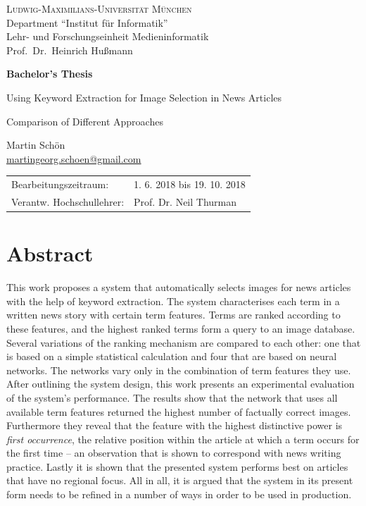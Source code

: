 \documentclass[11pt,a4paper,twoside]{article}
\begin{document}
\pagestyle{empty} %

\begin{center}
\textsc{Ludwig-Maximilians-Universität München}\\
Department ``Institut für Informatik''\\
Lehr- und Forschungseinheit Medieninformatik\\
Prof.\ Dr.\ Heinrich Hußmann

\vspace{5cm}
{\large\textbf{Bachelor's Thesis}}\vspace{.5cm}

{\LARGE Using Keyword Extraction for Image Selection in News Articles}\vspace{.3cm}

{\Large Comparison of Different Approaches}\vspace{1cm}

{\large Martin Schön}\\\href{mailto:martingeorg.schoen@gmail.com}{martingeorg.schoen@gmail.com}

\end{center}
\vfill

\begin{tabular}{ll}
Bearbeitungszeitraum: & 1. 6. 2018 bis 19. 10. 2018\\
Verantw. Hochschullehrer: & Prof. Dr. Neil Thurman
\end{tabular}

\clearpage
{}
\section*{Abstract}

This work proposes a system that automatically selects images for news articles with the help of keyword extraction. The system characterises each term in a written news story with certain term features. Terms are ranked according to these features, and the highest ranked terms form a query to an image database. Several variations of the ranking mechanism are compared to each other: one that is based on a simple statistical calculation and four that are based on neural networks. The networks vary only in the combination of term features they use. After outlining the system design, this work presents an experimental evaluation of the system's performance. The results show that the network that uses all available term features returned the highest number of factually correct images. Furthermore they reveal that the feature with the highest distinctive power is \emph{first occurrence}, the relative position within the article at which a term occurs for the first time -- an observation that is shown to correspond with news writing practice. Lastly it is shown that the presented system performs best on articles that have no regional focus. All in all, it is argued that the system in its present form needs to be refined in a number of ways in order to be used in production.
\end{document}

